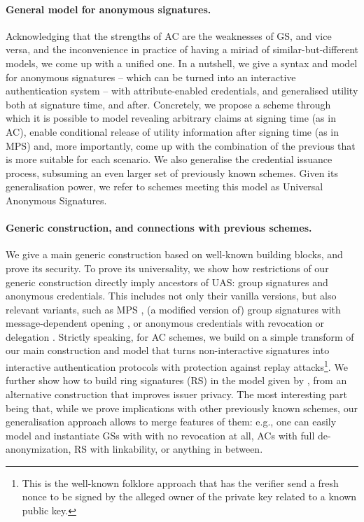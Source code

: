 \paragraph{General model for anonymous signatures.} %
Acknowledging that the strengths of AC are the weaknesses of GS, and vice versa,
and the inconvenience in practice of having a miriad of similar-but-different
models, we come up with a unified one. In a nutshell, we give a syntax and model
for anonymous signatures -- which can be turned into an interactive
authentication system -- with attribute-enabled credentials, and generalised
utility both at signature time, and after. Concretely, we propose a scheme
through which it is possible to model revealing arbitrary claims at signing time
(as in AC), enable conditional release of utility information after signing time
(as in MPS) and, more importantly, come up with the combination of the previous
that is more suitable for each scenario. We also generalise the credential
issuance process, subsuming an even larger set of previously known schemes.
Given its generalisation power, we refer to schemes meeting this model as
Universal Anonymous Signatures.

\paragraph{Generic construction, and connections with previous schemes.} %
We give a main generic construction based on well-known building blocks, and
prove its security. To prove its universality, we show how restrictions of our
generic construction directly imply ancestors of UAS: group
signatures and anonymous credentials. This includes not only their vanilla
versions, but also relevant variants, such as MPS \cite{ngsy22}, (a modified
version of) group signatures with message-dependent opening \cite{seh+12}, or
anonymous credentials with revocation \cite{cks10} or delegation \cite{bcc+09}.
Strictly speaking, for AC schemes, we build on a simple transform of our main
construction and model that turns non-interactive signatures into interactive
authentication protocols with protection against replay attacks\footnote{This is
  the well-known folklore approach that has the verifier send a fresh nonce to
  be signed by the alleged owner of the private key related to a known
  public key.}. We further show how to
build ring signatures (RS) in the model given by \cite{bkm06}, from an
alternative \UAS construction that improves issuer privacy.
%
The most interesting part being that, while we prove implications with other
previously known schemes, our generalisation approach allows to merge features
of them: e.g., one can easily model and instantiate GSs with with no revocation
at all, ACs with full de-anonymization, RS with linkability, or anything in
between.

